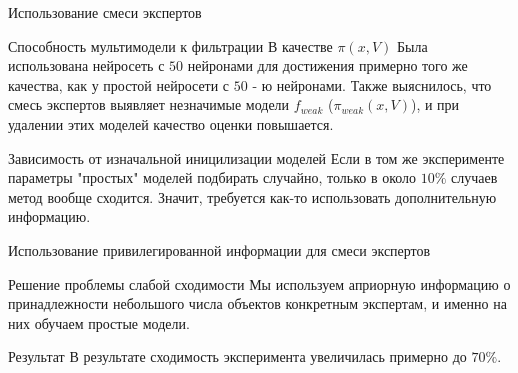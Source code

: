 \documentclass{beamer}
\begin{document}
\begin{frame}{Использование смеси экспертов}
\begin{block}{Способность мультимодели к фильтрации}
В качестве $\pi(x, V)$ Была использована нейросеть с $50$ нейронами для достижения примерно того же качества, как у  простой нейросети  с $50$ - ю нейронами. Также выяснилось, что смесь экспертов выявляет незначимые модели $f_{weak}$ ($\pi_{weak} (x, V)$), и при удалении этих моделей качество оценки повышается. 
\end{block}


\begin{block}{Зависимость от изначальной иницилизации моделей}
Если в том же эксперименте  параметры "простых" моделей  подбирать случайно, только в около $10 \% $ случаев метод вообще  сходится. Значит, требуется как-то использовать дополнительную информацию.
\end{block}
\end{frame}


\begin{frame}{Использование привилегированной информации для смеси экспертов}
\begin{block}{Решение проблемы слабой сходимости}
Мы используем априорную информацию о принадлежности небольшого числа объектов конкретным экспертам, и именно на них 
обучаем простые модели. 

\begin{figure}[!htb]
\end{figure}

\end{block}

\begin{block}{Результат}
В результате сходимость эксперимента увеличилась примерно до $70 \%$. 
\end{block}

\end{frame}
\end{document}
